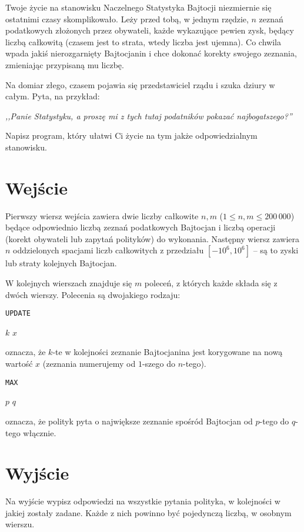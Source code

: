 \documentclass{spiral-kurs}
\begin{document}
\makeheader
%
  
  
Twoje życie na stanowisku Naczelnego Statystyka Bajtocji niezmiernie
się ostatnimi czasy skomplikowało. Leży przed tobą, w jednym rzędzie, $n$ zeznań podatkowych złożonych przez obywateli, każde wykazujące 
pewien zysk, będący liczbą całkowitą (czasem jest to strata, wtedy liczba jest ujemna). 
Co chwila wpada jakiś nierozgarnięty Bajtocjanin i chce dokonać korekty swojego zeznania, zmieniając przypisaną mu liczbę.

Na domiar złego, czasem pojawia się przedstawiciel rządu i szuka dziury w całym. Pyta, na przykład:

{\it ,,Panie Statystyku, a proszę mi z tych tutaj podatników pokazać
najbogatszego?'' }

Napisz program, który ułatwi Ci życie na tym jakże odpowiedzialnym stanowisku.

    \section{Wejście}

Pierwszy wiersz wejścia zawiera dwie liczby całkowite $n, m$ ($1 \leq n,m
\leq 200\,000$) będące odpowiednio liczbą zeznań podatkowych
Bajtocjan i liczbą operacji (korekt obywateli lub zapytań polityków) do wykonania. 
Następny wiersz zawiera $n$ oddzielonych spacjami liczb całkowitych z przedziału $[-10^6, 10^6]$ -- są to zyski lub straty kolejnych
Bajtocjan. 


W kolejnych wierszach znajduje się $m$ poleceń, z których każde składa
się z dwóch wierszy. Polecenia są dwojakiego rodzaju:

\medskip
\texttt{UPDATE}

$k$ $x$
\medskip

oznacza, że $k$-te w kolejności zeznanie Bajtocjanina jest korygowane na
nową wartość $x$ (zeznania numerujemy od $1$-szego do $n$-tego).

\medskip
\texttt{MAX}

$p$ $q$
\medskip

oznacza, że polityk pyta o największe zeznanie spośród Bajtocjan od
$p$-tego do $q$-tego włącznie.


      
    \section{Wyjście}

Na wyjście wypisz odpowiedzi na wszystkie pytania polityka, w kolejności w jakiej zostały zadane. Każde z nich powinno być pojedynczą liczbą, w osobnym wierszu.

  
\end{document}

